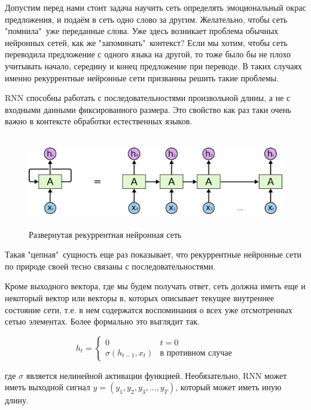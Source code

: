 \documentclass[a4paper,russian]{article}
\begin{document}
	Допустим перед нами стоит задача научить сеть определять эмоциональный окрас предложения, и подаём в сеть одно слово за другим. Желательно, чтобы сеть "помнила"\ уже переданные слова. Уже здесь возникает проблема обычных нейронных сетей, как же "запоминать"\ контекст? Если мы хотим, чтобы сеть переводила предложение с одного языка на другой, то тоже было бы не плохо учитывать начало, середину и конец предложение при переводе. В таких случаях именно рекуррентные нейронные сети призванны решить такие проблемы.

	RNN способны работать с последовательностями произвольной длины, а не с входными данными фиксированного размера. Это свойство как раз таки очень важно в контексте обработки естественных языков. 

	\begin{figure}[ht!]
		\centering
		\captionsetup{justification=centering}
		\includegraphics[height=40mm]{img/3.png}
		\caption{Развернутая рекуррентная нейронная сеть}
	\end{figure}
	
	Такая "цепная"\ сущность еще раз показывает, что рекуррентные нейронные сети по природе своей тесно связаны с последовательностями. 
	
	Кроме выходного вектора, где мы будем получать ответ, сеть должна иметь еще и некоторый вектор или векторы в, которых описывает текущее внутреннее состояние сети, т.е. в нем содержатся воспоминания о всех уже отсмотренных сетью элементах. Более формально это выглядит так.
	
	\begin{equation}
		h_t = 
		\begin{cases}
			0 & t = 0 \\
			\sigma(h_{t - 1}, x_t) & \text{в противном случае}
		\end{cases}
	\end{equation}

	где $\sigma$ является нелинейной активации функцией. Необязательно, RNN может иметь выходной сигнал $y = (y_1, y_2, y_3, ... , y_T)$, который может иметь иную длину.
	
\end{document}
